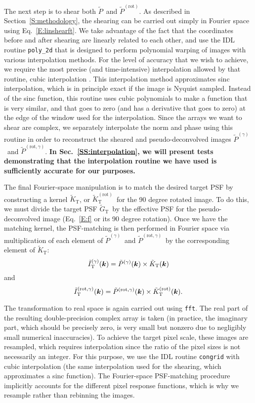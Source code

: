 \documentclass[twocolumn,useAMS,usenatbib]{mn2e}
\newcommand{\beq}{\begin{equation}}
\newcommand{\eeq}{\end{equation}}
\newcommand{\tps}{\ensuremath{\tilde{G}_\mathrm{T}}}
\newcommand{\ticpd}{\ensuremath{\tilde{P}}}
\newcommand{\ticpdr}{\ensuremath{\tilde{P}^\mathrm{(rot)}}}
\newcommand{\ticpds}{\ensuremath{\tilde{P}^{(\gamma)}}}
\newcommand{\ticpdrs}{\ensuremath{\tilde{P}^{(\mathrm{rot},\gamma)}}}
\newcommand{\tks}{\ensuremath{\tilde{K}_\mathrm{T}}}
\newcommand{\tksr}{\ensuremath{\tilde{K}_\mathrm{T}^\mathrm{(rot)}}}
\newcommand{\tis}{\ensuremath{\tilde{I}^{(\gamma)}_\mathrm{T}}}
\newcommand{\tisr}{\ensuremath{\tilde{I}^{(\mathrm{rot},\gamma)}_\mathrm{T}}}
\newcommand{\newtext}{}
\newcommand{\reftext}[1]{\textbf{#1}}
\begin{document}
The next step is to shear both \ticpd\ and \ticpdr.  As described in
Section~\ref{S:methodology}, the shearing can be carried out simply in
Fourier space using Eq.~\eqref{E:linshearft}.  We take advantage of the fact
that the coordinates before and after shearing are linearly related to
each other, and use the IDL routine {\tt poly\_2d} that is designed to
perform polynomial warping of images with various interpolation
methods.  For the level of accuracy that we wish to achieve, we
require the most precise (and time-intensive) interpolation allowed by
that routine, cubic interpolation \citep{1983CGIP...23..258P}.  This interpolation method approximates sinc
interpolation, which is in principle exact if the image is Nyquist
sampled.  Instead of the sinc function, this routine uses cubic polynomials to
make a function that is very similar, and that goes to zero (and 
 has a derivative that goes to zero) at the
edge of the window used for the interpolation.  Since the arrays we
want to shear are complex, we separately interpolate the norm and
phase using this routine in order to reconstruct the sheared and
pseudo-deconvolved images \ticpds\ and \ticpdrs.  \reftext{In
Sec.~\ref{SS:interpolation}, we will present tests demonstrating that
the interpolation routine we have used is sufficiently accurate for
our purposes.} %

The final Fourier-space manipulation is to match the desired target PSF by constructing a
kernel \tks, or \tksr\ for the 90 degree rotated image.  To do this,
we must divide the target PSF \tps\ by the effective PSF for the
pseudo-deconvolved image 
(Eq.~\ref{E:f} or its 90 degree rotation).  Once we have the
matching kernel, the PSF-matching is then performed in Fourier space
via multiplication of each element of \ticpds\ and \ticpdrs\ by the
corresponding element of \tks:
\beq
\tis({\bmath k}) = \ticpds({\bmath k}) \times \tks({\bmath k})
\eeq
and
\beq
\tisr({\bmath k}) = \ticpdrs({\bmath k}) \times \tksr({\bmath k}).
\eeq

The transformation to real space is again carried out using {\tt fft}.
The real part of the resulting double-precision complex array is taken
(in practice, the imaginary part, which should be precisely zero, is
very small but nonzero due to negligibly small numerical
inaccuracies).  To achieve the target pixel scale, these images are
resampled, which requires interpolation since the ratio of the pixel
sizes is not necessarily an integer.  For this purpose, we use the IDL
routine {\tt congrid} with cubic interpolation (the same interpolation
used for the shearing, which approximates a sinc function).  The
Fourier-space PSF-matching procedure implicitly accounts for the
different pixel response functions, which is why we resample rather
than rebinning the images.
\end{document}
